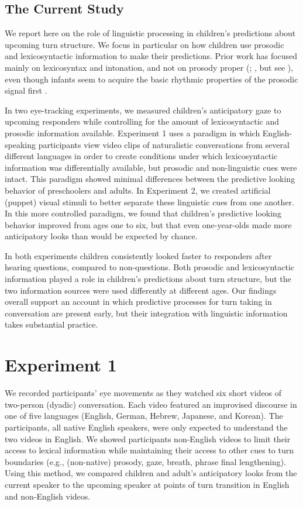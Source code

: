 \documentclass[authoryear, 12pt]{elsarticle}
\begin{document}
\subsection{The Current Study}
We report here on the role of linguistic processing in children's predictions about upcoming turn structure. We focus in particular on how children use prosodic and lexicosyntactic information to make their predictions. Prior work has focused mainly on lexicosyntax and intonation, and not on prosody proper (\citealp{de-ruiter2006}; \citealp{keitel2013}, but see \citealp{torreiraUndRev}), even though infants seem to acquire the basic rhythmic properties of the prosodic signal first \citep{mehler1988, moon1993, nazzi2003}.

In two eye-tracking experiments, we measured children's anticipatory gaze to upcoming responders while controlling for the amount of lexicosyntactic and prosodic information available. Experiment 1 uses a paradigm in which English-speaking participants view video clips of naturalistic conversations from several different languages in order to create conditions under which lexicosyntactic information was differentially available, but prosodic and non-linguistic cues were intact. This paradigm showed minimal differences between the predictive looking behavior of preschoolers and adults. In Experiment 2, we created artificial (puppet) visual stimuli to better separate these linguistic cues from one another. In this more controlled paradigm, we found that children's predictive looking behavior improved from ages one to six, but that even one-year-olds made more anticipatory looks than would be expected by chance. 

In both experiments children consistently looked faster to responders after hearing questions, compared to non-questions. Both prosodic and lexicosyntactic information played a role in children's predictions about turn structure, but the two information sources were used differently at different ages. Our findings overall support an account in which predictive processes for turn taking in conversation are present early, but their integration with linguistic information takes substantial practice. 

\section{Experiment 1}
\label{sec:exp1}

We recorded participants' eye movements as they watched six short videos of two-person (dyadic) conversation. Each video featured an improvised discourse in one of five languages (English, German, Hebrew, Japanese, and Korean). The participants, all native English speakers, were only expected to understand the two videos in English. We showed participants non-English videos to limit their access to lexical information while maintaining their access to other cues to turn boundaries (e.g., (non-native) prosody, gaze, breath, phrase final lengthening). Using this method, we compared children and adult's anticipatory looks from the current speaker to the upcoming speaker at points of turn transition in English and non-English videos.
\end{document}
